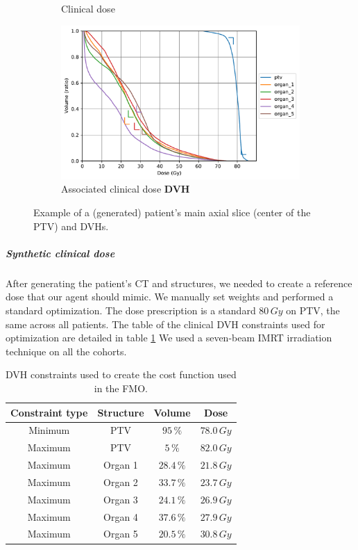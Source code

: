 \begin{figure}
\begin{subfigure}{0.48\linewidth}
		\caption{Clinical dose}
	\end{subfigure}
	\begin{subfigure}{\linewidth}
		\centering
		\includegraphics[width=0.8\linewidth]{AIME/dvh_example.pdf}
		\caption{Associated clinical dose \textbf{DVH}}
		\label{fig:clinical_dvh}
	\end{subfigure}
	\caption{Example of a (generated) patient's main axial slice (center of the PTV) and DVHs.}
\end{figure}

\subparagraph{Synthetic clinical dose}
After generating the patient's CT and structures, we needed to create a reference dose that our agent should mimic.
We manually set weights and performed a standard optimization.
The dose prescription is a standard $80\,\textit{Gy}$ on PTV, the same across all patients.
The table of the clinical DVH constraints used for optimization are detailed in table \ref{table:DVH_constraints}
We used a seven-beam IMRT irradiation technique on all the cohorts.

\begin{table}
	\begin{center}
		\begin{tabular}{| c | c | c | c |} 
			\hline
			Constraint type & Structure & Volume & Dose \\ 
			\hline
			Minimum & PTV & $95\,\%$ & $78.0\,\textit{Gy}$ \\
			Maximum & PTV & $5\,\%$ & $82.0\,\textit{Gy}$ \\
			Maximum & Organ 1 & $28.4\,\%$ & $21.8\,\textit{Gy}$ \\
			Maximum & Organ 2 & $33.7\,\%$ & $23.7\,\textit{Gy}$ \\
			Maximum & Organ 3 & $24.1\,\%$ & $26.9\,\textit{Gy}$ \\
			Maximum & Organ 4 & $37.6\,\%$ & $27.9\,\textit{Gy}$ \\
			Maximum & Organ 5 & $20.5\,\%$ & $30.8\,\textit{Gy}$ \\
			\hline
		\end{tabular}
	\end{center}
	\caption{
		DVH constraints used to create the cost function used in the FMO.
	}
	\label{table:DVH_constraints}
\end{table}

